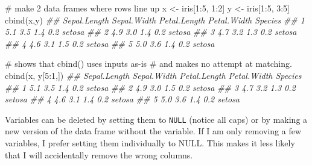 \documentclass[
  13,
  letterpaper,
]{report}
\newenvironment{Shaded}{\begin{snugshade}}{\end{snugshade}}
\newcommand{\CommentTok}[1]{\textcolor[rgb]{0.37,0.37,0.37}{#1}}
\newcommand{\DecValTok}[1]{\textcolor[rgb]{0.68,0.00,0.00}{#1}}
\newcommand{\DocumentationTok}[1]{\textcolor[rgb]{0.37,0.37,0.37}{\textit{#1}}}
\newcommand{\FunctionTok}[1]{\textcolor[rgb]{0.28,0.35,0.67}{#1}}
\newcommand{\NormalTok}[1]{\textcolor[rgb]{0.00,0.23,0.31}{#1}}
\newcommand{\OtherTok}[1]{\textcolor[rgb]{0.00,0.23,0.31}{#1}}
\newcommand{\SpecialCharTok}[1]{\textcolor[rgb]{0.37,0.37,0.37}{#1}}
\begin{document}
\begin{Shaded}
\begin{Highlighting}[]
\CommentTok{\# make 2 data frames where rows line up}
\NormalTok{x }\OtherTok{\textless{}{-}}\NormalTok{ iris[}\DecValTok{1}\SpecialCharTok{:}\DecValTok{5}\NormalTok{, }\DecValTok{1}\SpecialCharTok{:}\DecValTok{2}\NormalTok{]}
\NormalTok{y }\OtherTok{\textless{}{-}}\NormalTok{ iris[}\DecValTok{1}\SpecialCharTok{:}\DecValTok{5}\NormalTok{, }\DecValTok{3}\SpecialCharTok{:}\DecValTok{5}\NormalTok{]}
\FunctionTok{cbind}\NormalTok{(x,y)}
\DocumentationTok{\#\#   Sepal.Length Sepal.Width Petal.Length Petal.Width Species}
\DocumentationTok{\#\# 1          5.1         3.5          1.4         0.2  setosa}
\DocumentationTok{\#\# 2          4.9         3.0          1.4         0.2  setosa}
\DocumentationTok{\#\# 3          4.7         3.2          1.3         0.2  setosa}
\DocumentationTok{\#\# 4          4.6         3.1          1.5         0.2  setosa}
\DocumentationTok{\#\# 5          5.0         3.6          1.4         0.2  setosa}

\CommentTok{\# shows that cbind() uses inputs as{-}is}
\CommentTok{\# and makes no attempt at matching.}
\FunctionTok{cbind}\NormalTok{(x, y[}\DecValTok{5}\SpecialCharTok{:}\DecValTok{1}\NormalTok{,])}
\DocumentationTok{\#\#   Sepal.Length Sepal.Width Petal.Length Petal.Width Species}
\DocumentationTok{\#\# 1          5.1         3.5          1.4         0.2  setosa}
\DocumentationTok{\#\# 2          4.9         3.0          1.5         0.2  setosa}
\DocumentationTok{\#\# 3          4.7         3.2          1.3         0.2  setosa}
\DocumentationTok{\#\# 4          4.6         3.1          1.4         0.2  setosa}
\DocumentationTok{\#\# 5          5.0         3.6          1.4         0.2  setosa}
\end{Highlighting}
\end{Shaded}

Variables can be deleted by setting them to \texttt{NULL} (notice all
caps) or by making a new version of the data frame without the variable.
If I am only removing a few variables, I prefer setting them
individually to NULL. This makes it less likely that I will accidentally
remove the wrong columns.
\end{document}
